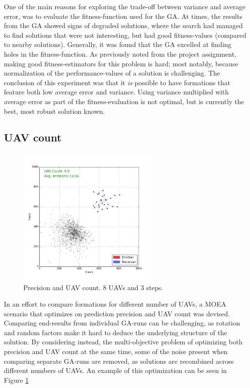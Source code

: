 \documentclass[10pt,a4paper]{book}
\begin{document}
One of the main reasons for exploring the trade-off between variance and average error, was to evaluate the fitness-function used for the \gls{GA}. At times, the results from the \gls{GA} showed signs of degraded solutions, where the search had managed to find solutions that were not interesting, but had good fitness-values (compared to nearby solutions). Generally, it was found that the \gls{GA} excelled at finding holes in the fitness-function. As previously noted from the project assignment, making good fitness-estimators for this problem is hard; most notably, because normalization of the performance-values of a solution is challenging. The conclusion of this experiment was that it \textit{is} possible to have formations that feature both low average error and variance. Using variance multiplied with average error as part of the fitness-evaluation is not optimal, but is currently the best, most robust solution known.

\newpage


\subsection{\Gls{UAV} count}

\begin{figure}[H]
\centering
\includegraphics[width=70mm]{3_steps/Generation_1000/Pareto_0.png}
\caption{Precision and \gls{UAV} count. 8 \glspl{UAV} and 3 steps.}
\label{moea_count_steps3_uavs8}
\end{figure}


In an effort to compare formations for different number of \glspl{UAV}, a \gls{MOEA} scenario that optimizes on prediction precision and \gls{UAV} count was devised. Comparing end-results from individual \gls{GA}-runs can be challenging, as rotation and random factors make it hard to deduce the underlying structure of the solution. By considering instead, the multi-objective problem of optimizing both precision and \gls{UAV} count at the same time, some of the noise present when comparing separate \gls{GA}-runs are removed, as solutions are recombined across different numbers of \glspl{UAV}. An example of this optimization can be seen in Figure \ref{moea_count_steps3_uavs8}
\end{document}
